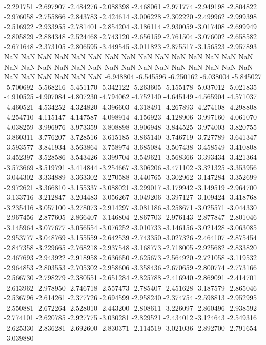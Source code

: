 -2.291751
-2.697907
-2.484276
-2.088398
-2.468061
-2.971774
-2.949198
-2.804822
-2.976058
-2.755866
-2.843783
-2.424614
-3.006228
-2.302220
-2.499962
-2.999398
-2.516922
-2.933955
-2.781401
-2.854204
-3.186114
-2.930059
-3.017408
-2.699949
-2.805829
-2.884348
-2.524468
-2.743120
-2.656159
-2.761504
-3.076002
-2.658582
-2.671648
-2.373105
-2.806595
-3.449545
-3.011823
-2.875517
-3.156523
-2.957893
NaN
NaN
NaN
NaN
NaN
NaN
NaN
NaN
NaN
NaN
NaN
NaN
NaN
NaN
NaN
NaN
NaN
NaN
NaN
NaN
NaN
NaN
NaN
NaN
NaN
NaN
NaN
NaN
NaN
NaN
NaN
NaN
NaN
NaN
NaN
NaN
-6.948804
-6.545596
-6.250162
-6.038004
-5.845027
-5.700692
-5.568216
-5.451170
-5.342122
-5.263605
-5.155178
-5.037012
-5.021835
-4.910525
-4.907084
-4.807230
-4.794062
-4.752140
-4.645149
-4.565904
-4.571037
-4.460521
-4.534252
-4.324820
-4.396603
-4.318491
-4.267893
-4.274108
-4.298808
-4.254710
-4.115147
-4.147587
-4.098914
-4.156923
-4.128906
-3.997160
-4.061070
-4.038259
-3.996976
-3.973359
-3.808898
-3.906948
-3.844525
-3.974003
-3.820755
-3.860311
-3.776207
-3.728516
-3.615185
-3.865140
-3.746719
-3.727789
-3.641347
-3.593577
-3.841934
-3.563864
-3.758974
-3.685084
-3.507438
-3.458549
-3.410808
-3.452397
-3.528586
-3.543426
-3.399704
-3.549621
-3.568366
-3.393434
-3.421364
-3.573669
-3.519791
-3.414844
-3.254667
-3.306206
-3.471102
-3.321325
-3.353956
-3.044302
-3.334889
-3.363302
-3.270588
-3.440765
-3.302962
-3.147284
-3.352699
-2.972621
-3.366810
-3.155337
-3.088021
-3.299017
-3.179942
-3.149519
-2.964700
-3.133716
-3.212847
-3.204483
-3.056267
-3.049206
-3.397127
-3.109424
-3.418768
-3.235416
-3.057100
-3.278073
-2.914297
-3.081186
-3.258671
-3.025571
-3.044330
-2.967456
-2.877605
-2.866407
-3.146804
-2.867703
-2.976143
-2.877847
-2.801046
-3.145964
-3.077677
-3.056554
-3.076252
-3.010733
-3.146156
-3.021428
-3.063085
-2.953777
-3.048769
-3.155559
-2.642539
-2.743350
-3.027326
-2.464107
-2.875454
-2.847358
-3.229665
-2.768218
-2.937548
-3.168773
-2.718005
-2.925682
-2.833820
-2.467693
-2.943922
-2.918958
-2.636650
-2.625673
-2.564920
-2.721058
-3.119532
-2.964853
-2.803553
-2.705302
-2.958606
-3.358436
-2.670659
-2.800774
-2.773166
-2.566730
-2.798279
-2.380551
-2.651284
-2.825788
-2.416940
-2.869091
-2.414701
-2.613962
-2.978950
-2.746718
-2.557473
-2.785407
-2.451628
-3.187579
-2.865046
-2.536796
-2.614261
-2.377726
-2.694599
-2.958240
-2.374754
-2.598813
-2.952995
-2.550881
-2.672264
-2.528010
-2.443200
-2.808611
-3.226097
-2.860496
-2.938592
-2.774101
-2.620785
-2.927775
-3.030281
-2.829521
-2.434012
-3.124643
-2.549316
-2.625330
-2.836281
-2.692600
-2.830371
-2.114519
-3.021036
-2.892700
-2.791654
-3.039880

